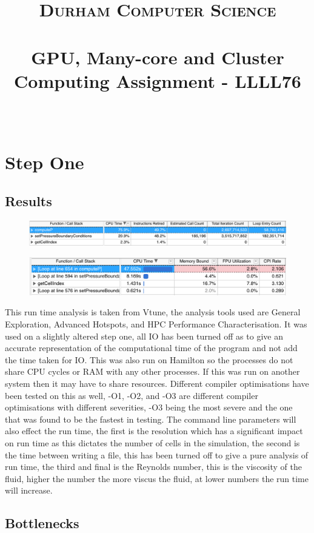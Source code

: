 \documentclass[paper=a4, fontsize=11pt]{scrartcl}
\date{}
\title{
		\vspace{-1in} 	
		\usefont{OT1}{bch}{b}{n}
		\normalfont \normalsize \textsc{Durham Computer Science} \\ [5pt]
		\horrule{0.5pt} \\[0.4cm]
		\large  GPU, Many-core and Cluster Computing Assignment - LLLL76\\
		\horrule{2pt} \\[0.5cm]
		\vspace{-1in} 	
}
\numberwithin{equation}{section}		%
\numberwithin{figure}{section}			%
\numberwithin{table}{section}				%
\begin{document}
\maketitle
\section{Step One}
\subsection{Results}
\begin{figure}[h]
\caption{}
\includegraphics[width=\textwidth]{one.png}
\end{figure}
\begin{figure}[h]
\caption{}
\includegraphics[width=\textwidth]{two.png}
\end{figure}

This run time analysis is taken from Vtune, the analysis tools used are General Exploration, Advanced Hotspots, and HPC Performance Characterisation. It was used on a slightly altered step one, all IO has been turned off as to give an accurate representation of the computational time of the program and not add the time taken for IO. This was also run on Hamilton so the processes do not share CPU cycles or RAM with any other processes. If this was run on another system then it may have to share resources. Different compiler optimisations have been tested on this as well, -O1, -O2, and -O3 are different compiler optimisations with different severities, -O3 being the most severe and the one that was found to be the fastest in testing.
The command line parameters will also effect the run time, the first is the resolution which has a significant impact on run time as this dictates the number of cells in the simulation, the second is the time between writing a file, this has been turned off to give a pure analysis of run time, the third and final is the Reynolds number, this is the viscosity of the fluid, higher the number the more viscus the fluid, at lower numbers the run time will increase.

\subsection{Bottlenecks}
\end{document}
